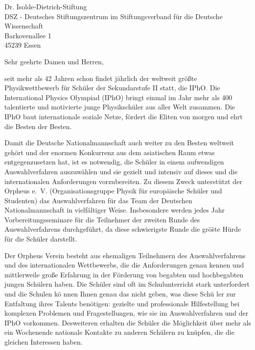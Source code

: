 \documentclass[../style/orpheus,fontsize=11pt]{scrlttr2}
\begin{document}

\begin{letter}{
\noindent Dr. Isolde-Dietrich-Stiftung \\
DSZ - Deutsches Stiftungszentrum im Stiftungsverband f\"ur die Deutsche Wissenschaft \\
Barkovenallee 1\\
45239 Essen
}



\opening{Sehr geehrte Damen und Herren,}

seit mehr als 42 Jahren schon findet j\"ahrlich der weltweit gr\"o\ss te Physikwettbewerb f\"ur Sch\"uler der Sekundarstufe II statt, die IPhO.  Die International Physics Olympiad (IPhO) bringt einmal im Jahr mehr als 400 talentierte und motivierte junge Physiksch\"uler aus aller Welt zusammen.  Die IPhO baut internationale soziale Netze, f\"ordert die Eliten von morgen und ehrt die Besten der Besten.

Damit die Deutsche Nationalmannschaft auch weiter zu den Besten weltweit geh\"ort und der enormen Konkurrenz aus dem asiatischen Raum etwas entgegenzusetzen hat, ist es notwendig, die Sch\"uler in einem aufwendigen Auswahlverfahren auszuw\"ahlen und sie gezielt und intensiv auf dieses und die internationalen Anforderungen vorzubereiten.  Zu diesem Zweck unterst\"utzt der Orpheus e.\, V. (Organisationsgruppe Physik f\"ur europ\"aische Sch\"uler und Studenten) das Auswahlverfahren f\"ur das Team der Deutschen Nationalmannschaft in vielf\"altiger Weise.  Insbesondere werden jedes Jahr Vorbereitungsseminare f\"ur die Teilnehmer der zweiten Runde des Auswahlverfahrens durchgef\"uhrt, da diese schwierigste Runde die gr\"o\"ste H\"urde f\"ur die Sch\"uler darstellt.

Der Orpheus Verein besteht aus ehemaligen Teilnehmern des Auswahlverfahrens und des internationalen Wettbewerbs, die die Anforderungen genau kennen und mittlerweile gro\ss e Erfahrung in der F\"orderung von begabten und hochbegabten jungen Sch\"ulern haben.  Die Sch\"uler sind oft im Schulunterricht stark unterfordert und die Schulen k\"o nnen Ihnen genau das nicht geben, was diese Sch\"u ler zur Entfaltung ihres Talents ben\"otigen: gezielte und professionale Hilfestellung bei komplexen Problemen und Fragestellungen, wie sie im Auswahlverfahren und der IPhO vorkommen.  Desweiteren erhalten die Sch\"uler die M\"oglichkeit \"uber mehr als ein Wochenende nationale Kontakte zu anderen Sch\"ulern zu kn\"upfen, die die gleichen Interessen haben.


\end{letter}
\end{document}
